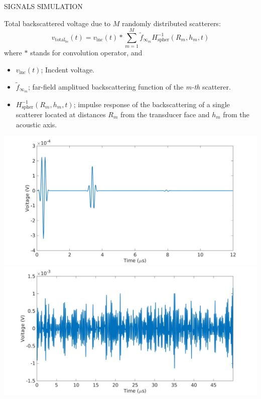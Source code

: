 \documentclass[handout]{beamer}
\newcommand\Fontable{\fontsize{9}{10}\selectfont}
\begin{document}

\begin{frame}{SIGNALS SIMULATION}
\Fontable

Total backscattered voltage due to $M$ randomly distributed scatterers:
\begin{equation}
v_{\text{total}_{bs}}(t) = v_\text{inc}(t) * \sum_{m=1}^{M} \tilde{f}_{\infty_m} H^{-1}_\text{spher}(R_m,h_m,t)
\end{equation}
where $*$ stands for convolution operator, and
\begin{itemize}
\item $v_\text{inc}(t)$; Incdent voltage.
\item $\tilde{f}_{\infty_m}$; far-field amplitued backscattering function of the \textit{m-th} scatterer.
\item $H^{-1}_\text{spher}(R_m,h_m,t)$; impulse response of the backscattering of a single scatterer located at distances $R_m$ from the transducer face and $h_m$ from the acoustic axis.
\end{itemize}

\begin{center}
{\includegraphics[width=0.37\paperwidth]{imagenes/respuesta_uno_solo.jpg}}
{\includegraphics[width=0.37\paperwidth]{imagenes/respuesta_muchos.jpg}}
\end{center}

\end{frame}
\end{document}
